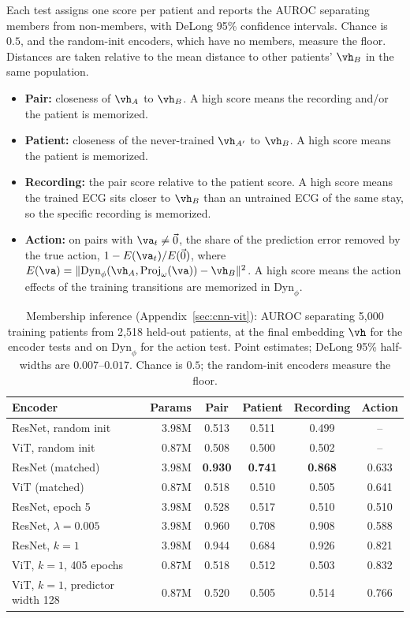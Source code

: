Each test assigns one score per patient and reports the AUROC separating members from non-members, with DeLong 95\% confidence intervals. Chance is $0.5$, and the random-init encoders, which have no members, measure the floor. Distances are taken relative to the mean distance to other patients' $\vh_B$ in the same population.
\begin{itemize}
\item \textbf{Pair:} closeness of $\vh_A$ to $\vh_B$. A high score means the recording and/or the patient is memorized.
\item \textbf{Patient:} closeness of the never-trained $\vh_{A'}$ to $\vh_B$. A high score means the patient is memorized.
\item \textbf{Recording:} the pair score relative to the patient score. A high score means the trained ECG sits closer to $\vh_B$ than an untrained ECG of the same stay, so the specific recording is memorized.
\item \textbf{Action:} on pairs with $\va_t\neq\vec 0$, the share of the prediction error removed by the true action, $1-E(\va_t)/E(\vec 0)$, where $E(\va)=\lVert\text{Dyn}_\phi(\vh_A,\text{Proj}_\omega(\va))-\vh_B\rVert^2$. A high score means the action effects of the training transitions are memorized in $\text{Dyn}_\phi$.
\end{itemize}

\begin{table}[t]
\caption{Membership inference (Appendix~\ref{sec:cnn-vit}): AUROC separating 5{,}000 training patients from 2{,}518 held-out patients, at the final embedding $\vh$ for the encoder tests and on $\text{Dyn}_\phi$ for the action test. Point estimates; DeLong 95\% half-widths are $0.007$--$0.017$. Chance is $0.5$; the random-init encoders measure the floor.}
\label{tab:cnn-vit-memorization}
\centering
\begin{tabular}{@{}l r cccc@{}}
\toprule
\textbf{Encoder} & \textbf{Params} & \textbf{Pair} & \textbf{Patient} & \textbf{Recording} & \textbf{Action} \\
\midrule
ResNet, random init               & 3.98M & 0.513 & 0.511 & 0.499 & -- \\
ViT, random init                  & 0.87M & 0.508 & 0.500 & 0.502 & -- \\
\addlinespace
ResNet (matched)                  & 3.98M & \textbf{0.930} & \textbf{0.741} & \textbf{0.868} & 0.633 \\
ViT (matched)                     & 0.87M & 0.518 & 0.510 & 0.505 & 0.641 \\
\addlinespace
ResNet, epoch 5                   & 3.98M & 0.528 & 0.517 & 0.510 & 0.510 \\
ResNet, $\lambda=0.005$           & 3.98M & 0.960 & 0.708 & 0.908 & 0.588 \\
ResNet, $k=1$                     & 3.98M & 0.944 & 0.684 & 0.926 & 0.821 \\
ViT, $k=1$, 405 epochs            & 0.87M & 0.518 & 0.512 & 0.503 & 0.832 \\
ViT, $k=1$, predictor width 128   & 0.87M & 0.520 & 0.505 & 0.514 & 0.766 \\
\bottomrule
\end{tabular}
\end{table}

